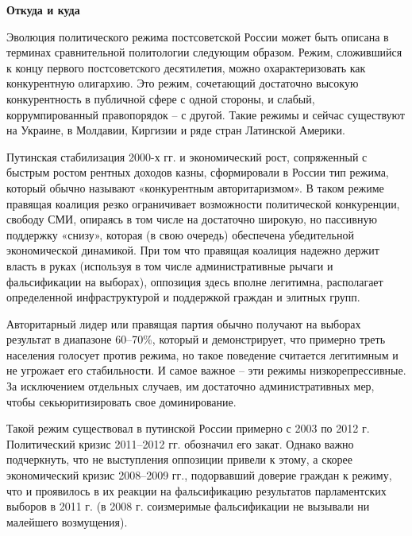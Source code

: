 \textbf{Откуда и куда}



Эволюция политического режима постсоветской России может быть описана в терминах сравнительной политологии следующим образом. Режим, сложившийся к концу первого постсоветского десятилетия, можно охарактеризовать как конкурентную олигархию. Это режим, сочетающий достаточно высокую конкурентность в публичной сфере с одной стороны, и слабый, коррумпированный правопорядок – с другой. Такие режимы и сейчас существуют на Украине, в Молдавии, Киргизии и ряде стран Латинской Америки.

Путинская стабилизация 2000-х гг. и экономический рост, сопряженный с быстрым ростом рентных доходов казны, сформировали в России тип режима, который обычно называют «конкурентным авторитаризмом». В таком режиме правящая коалиция резко ограничивает возможности политической конкуренции, свободу СМИ, опираясь в том числе на достаточно широкую, но пассивную поддержку «снизу», которая (в свою очередь) обеспечена убедительной экономической динамикой. При том что правящая коалиция надежно держит власть в руках (используя в том числе административные рычаги и фальсификации на выборах), оппозиция здесь вполне легитимна, располагает определенной инфраструктурой и поддержкой граждан и элитных групп.

Авторитарный лидер или правящая партия обычно получают на выборах результат в диапазоне 60–70\%, который и демонстрирует, что примерно треть населения голосует против режима, но такое поведение считается легитимным и не угрожает его стабильности. И самое важное – эти режимы низкорепрессивные. За исключением отдельных случаев, им достаточно административных мер, чтобы секьюритизировать свое доминирование.

Такой режим существовал в путинской России примерно с 2003 по 2012 г. Политический кризис 2011–2012 гг. обозначил его закат. Однако важно подчеркнуть, что не выступления оппозиции привели к этому, а скорее экономический кризис 2008–2009 гг., подорвавший доверие граждан к режиму, что и проявилось в их реакции на фальсификацию результатов парламентских выборов в 2011 г. (в 2008 г. соизмеримые фальсификации не вызывали ни малейшего возмущения).

